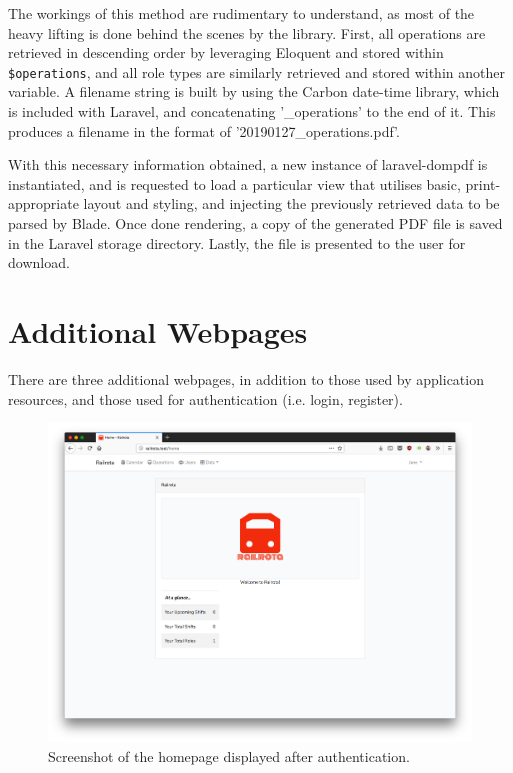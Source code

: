 The workings of this method are rudimentary to understand, as most of the heavy lifting is done behind the scenes by the library. First, all operations are retrieved in descending order by leveraging Eloquent and stored within \texttt{\$operations}, and all role types are similarly retrieved and stored within another variable. A filename string is built by using the Carbon date-time library, which is included with Laravel, and concatenating '\_operations' to the end of it. This produces a filename in the format of '20190127\_operations.pdf'.

With this necessary information obtained, a new instance of laravel-dompdf is instantiated, and is requested to load a particular view that utilises basic, print-appropriate layout and styling, and injecting the previously retrieved data to be parsed by Blade. Once done rendering, a copy of the generated PDF file is saved in the Laravel storage directory. Lastly, the file is presented to the user for download.

\section{Additional Webpages}
There are three additional webpages, in addition to those used by application resources, and those used for authentication (i.e. login, register).

\begin{figure}[!ht]
    \centering
    \includegraphics[width=1.0\textwidth]{Figures/screenshot-homepage}
    \caption{Screenshot of the homepage displayed after authentication.}
    \label{fig:homepage-screenshot}
\end{figure}

